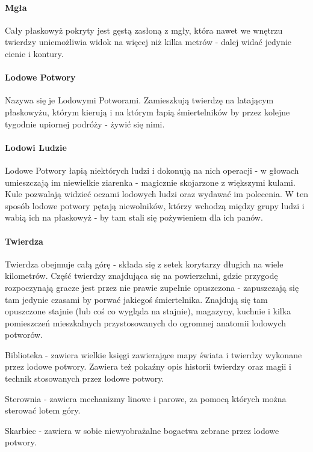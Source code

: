 \documentclass[12pt,a4paper]{article}
\begin{document}
\paragraph{Mgła}
Cały płaskowyż pokryty jest gęstą zasłoną z mgły, która nawet we
wnętrzu twierdzy uniemożliwia widok na więcej niż kilka metrów - dalej
widać jedynie cienie i kontury.

\paragraph{Lodowe Potwory}
Nazywa się je Lodowymi Potworami. Zamieszkują twierdzę na latającym
płaskowyżu, którym kierują i na którym łapią śmiertelników by przez
kolejne tygodnie upiornej podróży - żywić się nimi.

\paragraph{Lodowi Ludzie}
Lodowe Potwory łapią niektórych ludzi i dokonują na nich operacji - w
głowach umieszczają im niewielkie ziarenka - magicznie skojarzone z
większymi kulami. Kule pozwalają widzieć oczami lodowych ludzi oraz
wydawać im polecenia. W ten sposób lodowe potwory pętają niewolników,
którzy wchodzą między grupy ludzi i wabią ich na płaskowyż - by tam
stali się pożywieniem dla ich panów.

\paragraph{Twierdza}
Twierdza obejmuje całą górę - składa się z setek korytarzy długich na
wiele kilometrów. Część twierdzy znajdująca się na
powierzchni, gdzie przygodę rozpoczynają gracze jest przez nie prawie
zupełnie opuszczona - zapuszczają się tam jedynie czasami by porwać
jakiegoś śmiertelnika. Znajdują się tam opuszczone stajnie (lub coś co
wygląda na stajnie), magazyny, kuchnie i kilka pomieszczeń
mieszkalnych przystosowanych do ogromnej anatomii lodowych potworów.

\begin{description}
\item{Biblioteka} - zawiera wielkie księgi zawierające mapy świata i
  twierdzy wykonane przez lodowe potwory. Zawiera też pokaźny opis
  historii twierdzy oraz magii i technik stosowanych przez lodowe
  potwory.
\item{Sterownia} - zawiera mechanizmy linowe i parowe, za pomocą
  których można sterować lotem góry.
\item{Skarbiec} - zawiera w sobie niewyobrażalne bogactwa zebrane
  przez lodowe potwory.
\end{description}
\end{document}
